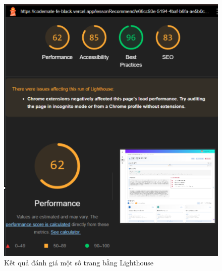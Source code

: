 \begin{figure}[H]
\begin{minipage}{0.45\textwidth}
  \includegraphics[width=\linewidth]{images/lighthouse_detail_lesson.png}
\end{minipage}

\vspace{1em}

\caption{Kết quả đánh giá một số trang bằng Lighthouse}
\end{figure}
